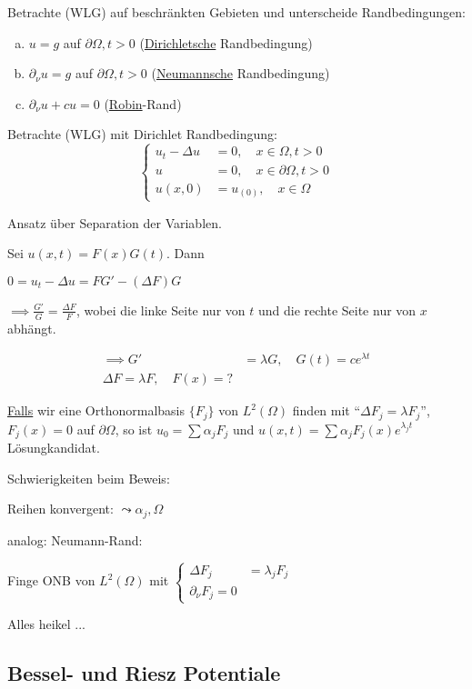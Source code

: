 Betrachte (WLG) auf beschränkten Gebieten und unterscheide Randbedingungen:
\begin{enumerate}[a)]
  \item $u = g$ auf $\partial \Omega, t > 0$ (\underline{Dirichletsche} Randbedingung)
  \item $\partial_\nu u = g$ auf $\partial \Omega, t > 0$ (\underline{Neumannsche} Randbedingung)
  \item $\partial_\nu u + cu = 0$ (\underline{Robin}-Rand)
\end{enumerate}

Betrachte (WLG) mit Dirichlet Randbedingung:
$$
\begin{cases}
  u_t - \Delta u &= 0, \quad x \in \Omega, t > 0 \\
  u &= 0, \quad x \in \partial \Omega, t > 0 \\
  u(x,0) &= u_(0), \quad x \in \Omega
\end{cases}
$$

Ansatz über Separation der Variablen.

Sei $u(x,t) = F(x) G(t)$.
Dann

$0 = u_t - \Delta u = FG' - (\Delta F) G$

$\implies \frac{G'}{G} = \frac{\Delta F}{F}$, wobei die linke Seite nur von $t$ und die rechte Seite nur von $x$ abhängt.

\begin{align*}
  \implies G' &= \lambda G, \quad G(t) = c e^{\lambda t} \\
  \Delta F = \lambda F, \quad F(x) = ?
\end{align*}

\underline{Falls} wir eine Orthonormalbasis $\{F_j\}$ von $L^2(\Omega)$ finden mit ``$\Delta F_j = \lambda F_j$'', $F_j(x) = 0$ auf $\partial \Omega$, so ist $u_0 = \sum \alpha_j F_j$ und $u(x,t) = \sum \alpha_j F_j(x) e^{\lambda_j t}$ Lösungkandidat.

Schwierigkeiten beim Beweis:

Reihen konvergent: $\leadsto \alpha_j, \Omega$

analog: Neumann-Rand: 

Finge ONB von $L^2(\Omega)$ mit $\begin{cases} \Delta F_j &= \lambda_j F_j \\ \partial_\nu F_j = 0 \end{cases}$

Alles heikel ...

\subsection{Bessel- und Riesz Potentiale}

